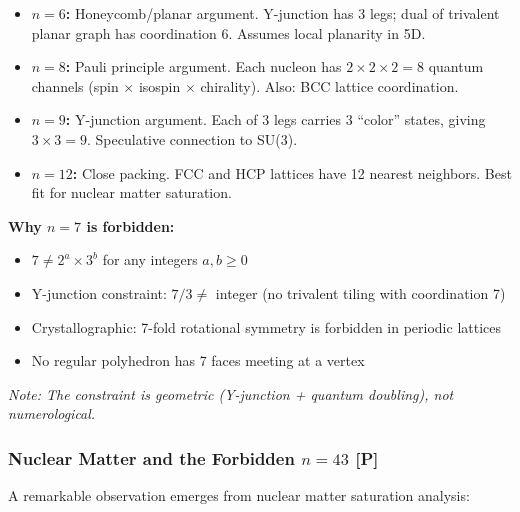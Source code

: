 \begin{itemize}
    \item \textbf{$n = 6$:} Honeycomb/planar argument. Y-junction has 3 legs; dual of trivalent planar graph has coordination 6. Assumes local planarity in 5D.

    \item \textbf{$n = 8$:} Pauli principle argument. Each nucleon has $2 \times 2 \times 2 = 8$ quantum channels (spin $\times$ isospin $\times$ chirality). Also: BCC lattice coordination.

    \item \textbf{$n = 9$:} Y-junction argument. Each of 3 legs carries 3 ``color'' states, giving $3 \times 3 = 9$. Speculative connection to SU(3).

    \item \textbf{$n = 12$:} Close packing. FCC and HCP lattices have 12 nearest neighbors. Best fit for nuclear matter saturation.
\end{itemize}

\textbf{Why $n = 7$ is forbidden:}
\begin{itemize}
    \item $7 \neq 2^a \times 3^b$ for any integers $a, b \geq 0$
    \item Y-junction constraint: $7/3 \neq$ integer (no trivalent tiling with coordination 7)
    \item Crystallographic: 7-fold rotational symmetry is forbidden in periodic lattices
    \item No regular polyhedron has 7 faces meeting at a vertex
\end{itemize}
\emph{Note: The constraint is geometric (Y-junction + quantum doubling), not numerological.}

\subsubsection{Nuclear Matter and the Forbidden $n = 43$ [P]}
\label{subsubsec:forbidden-43}

A remarkable observation emerges from nuclear matter saturation analysis:


